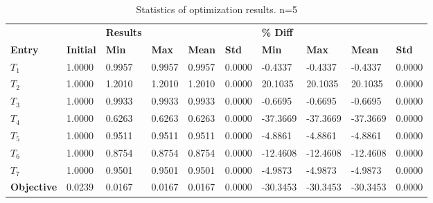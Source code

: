 \begin{table}[H]
\centering
\begin{tabular}{llllllllll}
\textbf{} & \textbf{} & \cellcolor[HTML]{EFEFEF}\textbf{Results} & \cellcolor[HTML]{EFEFEF} & \cellcolor[HTML]{EFEFEF} & \cellcolor[HTML]{EFEFEF} & \cellcolor[HTML]{EFEFEF}\textbf{\% Diff} & \cellcolor[HTML]{EFEFEF} & \cellcolor[HTML]{EFEFEF} & \cellcolor[HTML]{EFEFEF} \\
\rowcolor[HTML]{EFEFEF} 
\textbf{Entry} & \textbf{Initial} & \textbf{Min} & \textbf{Max} & \textbf{Mean} & \textbf{Std} & \textbf{Min} & \textbf{Max} & \textbf{Mean} & \textbf{Std} \\
$T_1$ & 1.0000 & 0.9957 & 0.9957 & 0.9957 & 0.0000 & -0.4337 & -0.4337 & -0.4337 & 0.0000 \\ 
$T_2$ & 1.0000 & 1.2010 & 1.2010 & 1.2010 & 0.0000 & 20.1035 & 20.1035 & 20.1035 & 0.0000 \\ 
$T_3$ & 1.0000 & 0.9933 & 0.9933 & 0.9933 & 0.0000 & -0.6695 & -0.6695 & -0.6695 & 0.0000 \\ 
$T_4$ & 1.0000 & 0.6263 & 0.6263 & 0.6263 & 0.0000 & -37.3669 & -37.3669 & -37.3669 & 0.0000 \\ 
$T_5$ & 1.0000 & 0.9511 & 0.9511 & 0.9511 & 0.0000 & -4.8861 & -4.8861 & -4.8861 & 0.0000 \\ 
$T_6$ & 1.0000 & 0.8754 & 0.8754 & 0.8754 & 0.0000 & -12.4608 & -12.4608 & -12.4608 & 0.0000 \\ 
$T_7$ & 1.0000 & 0.9501 & 0.9501 & 0.9501 & 0.0000 & -4.9873 & -4.9873 & -4.9873 & 0.0000 \\ 
\rowcolor[HTML]{EFEFEF} 
\textbf{Objective} & 0.0239 & 0.0167 & 0.0167 & 0.0167 & 0.0000 & -30.3453 & -30.3453 & -30.3453 & 0.0000 \\ 
\end{tabular}
\caption{Statistics of optimization results. n=5}
\label{tab:StatisticsOptimizationAnalysis}
\end{table}